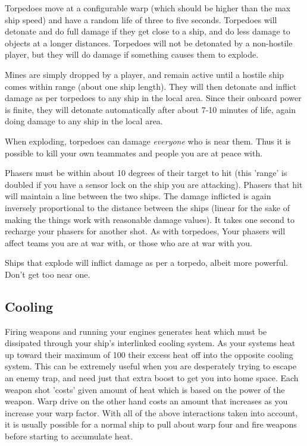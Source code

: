 Torpedoes move at a configurable warp (which should be higher than the max ship speed)
 and have a random life of three to five
seconds.  Torpedoes will detonate and do full damage if
they get close to a ship, and do less damage to objects at a
longer distances.  Torpedoes will not be detonated by a non-hostile
player, but they will do damage if something causes them to explode.

Mines are simply dropped by a player, and remain active until a hostile ship comes
within range (about one ship length).  They will then detonate and inflict damage
as per torpedoes to any ship in the local area.  Since their onboard power is finite,
they will detonate automatically after about 7-10 minutes of life, again doing
damage to any ship in the local area.

When exploding, torpedoes can damage {\em everyone} who is near them.
Thus it is possible to kill your own teammates and people you are at
peace with.

Phasers must be within about 10 degrees of their target to hit (this 'range' is doubled
if you have a sensor lock on the ship you are attacking).
Phasers that hit will maintain a line between the two ships.  The damage
inflicted is again inversely proportional to the distance between the
ships (linear for the sake of making the things work with reasonable
damage values).
It takes one second to recharge your phasers for
another shot.  As with torpedoes, Your phasers will affect teams 
you are at war with, or those who are at war with you.

Ships that explode will inflict damage as per a torpedo, albeit more powerful.  
Don't get too near one.

\subsection{Cooling}

Firing weapons and running your engines generates heat which must be
dissipated through your ship's interlinked cooling system. As your
systems heat up toward their maximum of 100%
their excess heat off into the opposite cooling system. This can be
extremely useful when you are desperately trying to escape an enemy
trap, and need just that extra boost to get you into home space. Each
weapon shot 'costs' given amount of heat which is based on the power of
the weapon. Warp drive on the other hand costs an amount that increases
as you increase your warp factor. With all of the above interactions
taken into account, it is usually possible for a normal ship to pull
about warp four and fire weapons before starting to accumulate heat.

